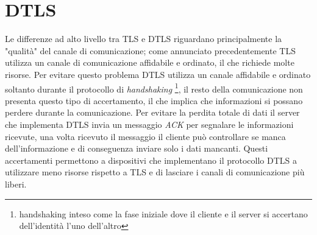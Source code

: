 \documentclass[12pt, a4paper]{report}
\begin{document}
\section{DTLS}
Le differenze ad alto livello tra TLS e DTLS riguardano principalmente la "qualità" del canale di comunicazione;
come annunciato precedentemente TLS utilizza un canale di comunicazione affidabile e ordinato, il che richiede molte risorse. 
Per evitare questo problema DTLS utilizza un canale affidabile e ordinato soltanto durante il protocollo di \textit{handshaking}
\footnote{handshaking inteso come la fase iniziale dove il cliente e il server si 
accertano dell'identità l'uno dell'altro}, 
il resto della comunicazione non presenta questo tipo di accertamento, il che implica
che informazioni si possano perdere durante la comunicazione.
Per evitare la perdita totale di dati
il server che implementa DTLS invia un messaggio \textit{ACK} per segnalare le informazioni ricevute,
una volta ricevuto il messaggio il cliente può controllare se manca dell'informazione e di conseguenza
inviare solo i dati mancanti.
Questi accertamenti permettono a dispositivi che implementano il protocollo DTLS
a utilizzare meno risorse rispetto a TLS e di lasciare i canali di comunicazione più liberi.
\end{document}
